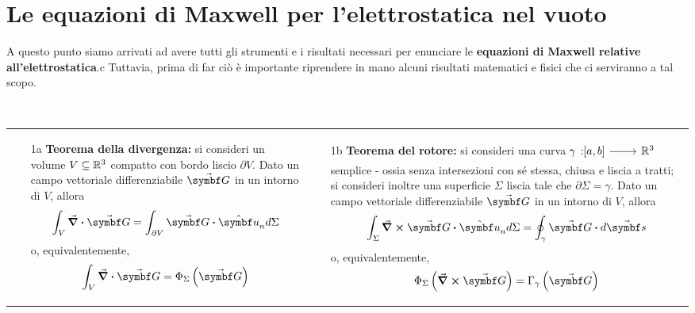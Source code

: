 \section{Le equazioni di Maxwell per l'elettrostatica nel vuoto}
A questo punto siamo arrivati ad avere tutti gli strumenti e i risultati necessari per enunciare le \textbf{equazioni di Maxwell relative all'elettrostatica}.c Tuttavia, prima di far ciò è importante riprendere in mano alcuni risultati matematici e fisici che ci serviranno a tal scopo.%
\begin{remember}~\\
		\begin{tabular}{p{}p{}}
			\begin{itemize}
				\item[1a] \textbf{Teorema della divergenza:} si consideri un volume $V\subseteq\mathbb{R}^3$ compatto con bordo liscio $\partial V$. Dato un campo vettoriale differenziabile $\vba{G}$ in un intorno di $V$, allora
				\begin{equation*}
					\int_V\div{\vba{G}}=\int_{\partial V}\vba{G}\vdot \vbh{u}_nd\Sigma
				\end{equation*}
				o, equivalentemente,
				\begin{equation*}
					\int_V\div{\vba{G}}=\Phi_\Sigma\left(\vba{G}\right)
				\end{equation*}
			\end{itemize} &
			\begin{itemize}
			\item[1b] \textbf{Teorema del rotore:} si consideri una curva $\funz[\gamma]{\left[a,b\right]}{\realset^3}$ semplice - ossia senza intersezioni con sé stessa, chiusa e liscia a tratti; si consideri inoltre una superficie $\Sigma$ liscia tale che $\partial \Sigma=\gamma$. Dato un campo vettoriale differenziabile $\vba{G}$ in un intorno di $V$, allora
			\begin{equation*}
				\int_\Sigma\curl{\vba{G}}\vdot\vbh{u}_nd\Sigma=\oint_{\gamma}\vba{G}\vdot d\vba{s}
			\end{equation*}
			o, equivalentemente,
			\begin{equation*}
				\Phi_\Sigma\left(\curl{\vba{G}}\right)=\Gamma_\gamma\left(\vba{G}\right)
			\end{equation*}
		\end{itemize}\end{tabular}\\
		\begin{tabular}{p{}p{}}

\end{tabular}
\end{remember}
